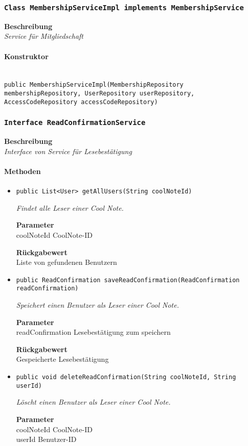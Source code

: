     \subsubsection{\texttt{Class MembershipServiceImpl implements MembershipService}}
    \textbf{Beschreibung} \\
    \textit{Service für Mitgliedschaft}
    \paragraph*{Konstruktor}\mbox{} \\
    \texttt{public MembershipServiceImpl(MembershipRepository membershipRepository, UserRepository userRepository, AccessCodeRepository accessCodeRepository)} \\
    \subsubsection{\texttt{Interface ReadConfirmationService}}
    \textbf{Beschreibung} \\
    \textit{Interface von Service für Lesebestätigung}
    \paragraph*{Methoden}
    \begin{itemize}
    	\item{\texttt{public List<User> getAllUsers(String coolNoteId)}}
    	
    	\textit{Findet alle Leser einer Cool Note.}
    	
    	\textbf{Parameter} \\
    	coolNoteId CoolNote-ID
    	
    	\textbf{Rückgabewert} \\
    	Liste von gefundenen Benutzern        \item{\texttt{public ReadConfirmation saveReadConfirmation(ReadConfirmation readConfirmation)}}
    	
    	\textit{Speichert einen Benutzer als Leser einer Cool Note.}
    	
    	\textbf{Parameter} \\
    	readConfirmation Lesebestätigung zum speichern
    	
    	\textbf{Rückgabewert} \\
    	Gespeicherte Lesebestätigung        \item{\texttt{public void deleteReadConfirmation(String coolNoteId, String userId)}}
    	
    	\textit{Löscht einen Benutzer als Leser einer Cool Note.}
    	
    	\textbf{Parameter} \\
    	coolNoteId CoolNote-ID\\
    	userId Benutzer-ID
    	
    \end{itemize}

